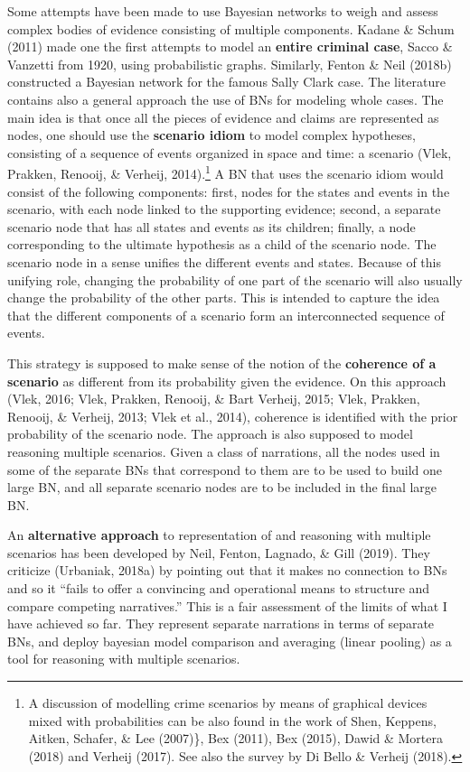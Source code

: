 \documentclass[11pt,dvipsnames,enabledeprecatedfontcommands]{scrartcl}
\begin{document}
Some attempts have been made to use Bayesian networks to weigh and
assess complex bodies of evidence consisting of multiple components.
Kadane \& Schum (2011) made one the first attempts to model an
\textbf{entire criminal case}, Sacco \& Vanzetti from 1920, using
probabilistic graphs. Similarly, Fenton \& Neil (2018b) constructed a
Bayesian network for the famous Sally Clark case. The literature
contains also a general approach the use of BNs for modeling whole
cases. The main idea is that once all the pieces of evidence and claims
are represented as nodes, one should use the \textbf{scenario idiom} to
model complex hypotheses, consisting of a sequence of events organized
in space and time: a scenario (Vlek, Prakken, Renooij, \& Verheij,
2014).\footnote{A discussion of modelling crime scenarios by means of
  graphical devices mixed with probabilities can be also found in the
  work of Shen, Keppens, Aitken, Schafer, \& Lee (2007)\}, Bex (2011),
  Bex (2015), Dawid \& Mortera (2018) and Verheij (2017). See also the
  survey by Di Bello \& Verheij (2018).} A BN that uses the scenario
idiom would consist of the following components: first, nodes for the
states and events in the scenario, with each node linked to the
supporting evidence; second, a separate scenario node that has all
states and events as its children; finally, a node corresponding to the
ultimate hypothesis as a child of the scenario node. The scenario node
in a sense unifies the different events and states. Because of this
unifying role, changing the probability of one part of the scenario will
also usually change the probability of the other parts. This is intended
to capture the idea that the different components of a scenario form an
interconnected sequence of events.

This strategy is supposed to make sense of the notion of the
\textbf{coherence of a scenario} as different from its probability given
the evidence. On this approach (Vlek, 2016; Vlek, Prakken, Renooij, \&
Bart Verheij, 2015; Vlek, Prakken, Renooij, \& Verheij, 2013; Vlek et
al., 2014), coherence is identified with the prior probability of the
scenario node. The approach is also supposed to model reasoning multiple
scenarios. Given a class of narrations, all the nodes used in some of
the separate BNs that correspond to them are to be used to build one
large BN, and all separate scenario nodes are to be included in the
final large BN.

An \textbf{alternative approach} to representation of and reasoning with
multiple scenarios has been developed by Neil, Fenton, Lagnado, \& Gill
(2019). They criticize (Urbaniak, 2018a) by pointing out that it makes
no connection to BNs and so it ``fails to offer a convincing and
operational means to structure and compare competing narratives.'' This
is a fair assessment of the limits of what I have achieved so far. They
represent separate narrations in terms of separate BNs, and deploy
bayesian model comparison and averaging (linear pooling) as a tool for
reasoning with multiple scenarios.
\end{document}
